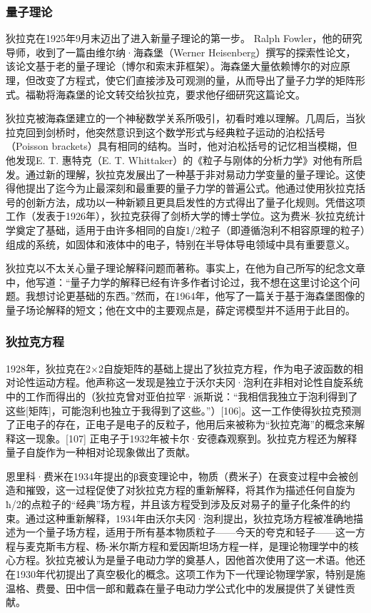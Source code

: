 \subsubsection{量子理论}  
狄拉克在1925年9月末迈出了进入新量子理论的第一步。 Ralph Fowler，他的研究导师，收到了一篇由维尔纳·海森堡（Werner Heisenberg）撰写的探索性论文，该论文基于老的量子理论（博尔和索末菲框架）。海森堡大量依赖博尔的对应原理，但改变了方程式，使它们直接涉及可观测的量，从而导出了量子力学的矩阵形式。福勒将海森堡的论文转交给狄拉克，要求他仔细研究这篇论文。

狄拉克被海森堡建立的一个神秘数学关系所吸引，初看时难以理解。几周后，当狄拉克回到剑桥时，他突然意识到这个数学形式与经典粒子运动的泊松括号（Poisson brackets）具有相同的结构。当时，他对泊松括号的记忆相当模糊，但他发现E. T. 惠特克（E. T. Whittaker）的《粒子与刚体的分析力学》对他有所启发。通过新的理解，狄拉克发展出了一种基于非对易动力学变量的量子理论。这使得他提出了迄今为止最深刻和最重要的量子力学的普遍公式。他通过使用狄拉克括号的创新方法，成功以一种新颖且更具启发性的方式得出了量子化规则。凭借这项工作（发表于1926年），狄拉克获得了剑桥大学的博士学位。这为费米–狄拉克统计学奠定了基础，适用于由许多相同的自旋1/2粒子（即遵循泡利不相容原理的粒子）组成的系统，如固体和液体中的电子，特别在半导体导电领域中具有重要意义。

狄拉克以不太关心量子理论解释问题而著称。事实上，在他为自己所写的纪念文章中，他写道：“量子力学的解释已经有许多作者讨论过，我不想在这里讨论这个问题。我想讨论更基础的东西。”然而，在1964年，他写了一篇关于基于海森堡图像的量子场论解释的短文；他在文中的主要观点是，薛定谔模型并不适用于此目的。
\subsubsection{狄拉克方程} 
1928年，狄拉克在2×2自旋矩阵的基础上提出了狄拉克方程，作为电子波函数的相对论性运动方程。他声称这一发现是独立于沃尔夫冈·泡利在非相对论性自旋系统中的工作而得出的（狄拉克曾对亚伯拉罕·派斯说：“我相信我独立于泡利得到了这些[矩阵]，可能泡利也独立于我得到了这些。”）[106]。这一工作使得狄拉克预测了正电子的存在，正电子是电子的反粒子，他用后来被称为“狄拉克海”的概念来解释这一现象。[107] 正电子于1932年被卡尔·安德森观察到。狄拉克方程还为解释量子自旋作为一种相对论现象做出了贡献。

恩里科·费米在1934年提出的β衰变理论中，物质（费米子）在衰变过程中会被创造和摧毁，这一过程促使了对狄拉克方程的重新解释，将其作为描述任何自旋为ħ/2的点粒子的“经典”场方程，并且该方程受到涉及反对易子的量子化条件的约束。通过这种重新解释，1934年由沃尔夫冈·泡利提出，狄拉克场方程被准确地描述为一个量子场方程，适用于所有基本物质粒子——今天的夸克和轻子——这一方程与麦克斯韦方程、杨-米尔斯方程和爱因斯坦场方程一样，是理论物理学中的核心方程。狄拉克被认为是量子电动力学的奠基人，因他首次使用了这一术语。他还在1930年代初提出了真空极化的概念。这项工作为下一代理论物理学家，特别是施温格、费曼、田中信一郎和戴森在量子电动力学公式化中的发展提供了关键性贡献。

